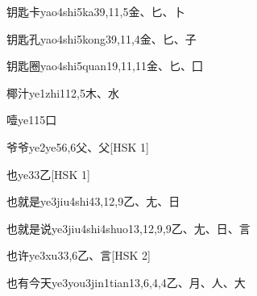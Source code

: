 \begin{entry}{钥匙卡}{yao4shi5ka3}{9,11,5}{⾦、⼔、⼘}
\end{entry}

\begin{entry}{钥匙孔}{yao4shi5kong3}{9,11,4}{⾦、⼔、⼦}
\end{entry}

\begin{entry}{钥匙圈}{yao4shi5quan1}{9,11,11}{⾦、⼔、⼞}
\end{entry}

\begin{entry}{椰汁}{ye1zhi1}{12,5}{⽊、⽔}
\end{entry}

\begin{entry}{噎}{ye1}{15}{⼝}
\end{entry}

\begin{entry}{爷爷}{ye2ye5}{6,6}{⽗、⽗}[HSK 1]
\end{entry}

\begin{entry}{也}{ye3}{3}{⼄}[HSK 1]
\end{entry}

\begin{entry}{也就是}{ye3jiu4shi4}{3,12,9}{⼄、⼪、⽇}
\end{entry}

\begin{entry}{也就是说}{ye3jiu4shi4shuo1}{3,12,9,9}{⼄、⼪、⽇、⾔}
\end{entry}

\begin{entry}{也许}{ye3xu3}{3,6}{⼄、⾔}[HSK 2]
\end{entry}

\begin{entry}{也有今天}{ye3you3jin1tian1}{3,6,4,4}{⼄、⽉、⼈、⼤}
\end{entry}

